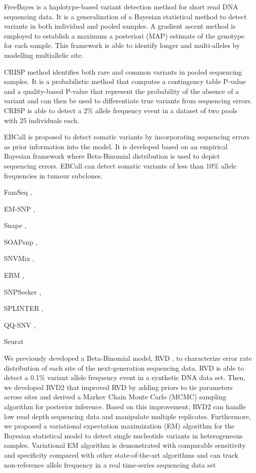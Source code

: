 \documentclass[11pt,reqno]{amsart}
\begin{document}
FreeBayes \citep{Garrison2012} is a haplotype-based variant detection method for short read DNA sequencing data.
It is a generalization of a Bayesian statistical method \citep{marth1999general} to detect variants in both individual and pooled samples.
A gradient ascent method is employed to establish a maximum a posteriori (MAP) estimate of the genotype for each sample.
This framework is able to identify longer and multi-alleles by modelling multiallelic site.

CRISP \citep{Bansal2010} method identifies both rare and common variants in pooled sequencing samples.
It is a probabilistic method that computes a contingency table P-value and a quality-based P-value that represent the probability of the absence of a variant and can then be used to differentiate true variants from sequencing errors.
CRISP is able to detect a 2\% allele frequency event in a dataset of two pools with 25 individuals each.

EBCall \citep{Shiraishi2013} is proposed to detect somatic variants by incorporating sequencing errors as prior information into the model.
It is developed based on an empirical Bayesian framework where Beta-Binomial distribution is used to depict sequencing errors.
EBCall can detect somatic variants of less than 10\% allele frequencies in tumour subclones. 

FamSeq \citep{Peng2013},

EM-SNP \citep{Chen2013},

Snape \citep{Raineri2012},

SOAPsnp \citep{Li2009},

SNVMix \citep{Goya2010},

EBM \citep{Zhou2012},

SNPSeeker \citep{Druley2009},

SPLINTER \citep{Spencer2014},

QQ-SNV \citep{VanderBorght2015},


Seurat \citep{Christoforides2013}

We previously developed a Beta-Binomial model, RVD \citep{Flaherty2012}, to characterize error rate distribution of each site of the next-generation sequencing data.
RVD is able to detect a 0.1\% variant allele frequency event in a synthetic DNA data set.
Then, we developed RVD2 \citep{He2015} that improved RVD by adding priors to tie parameters across sites and derived a Markov Chain Monte Carlo (MCMC) sampling algorithm for posterior inference.
Based on this improvement, RVD2 can handle low read depth sequencing data and manipulate multiple replicates.
Furthermore, we proposed a variational expectation maximization (EM) algorithm \citep{zhang2016variational} for the Bayesian statistical model to detect single nucleotide variants in heterogeneous samples.
Variational EM algorithm is demonstrated with comparable sensitivity and specificity compared with other state-of-the-art algorithms and can track non-reference allele frequency in a real time-series sequencing data set
\end{document}
